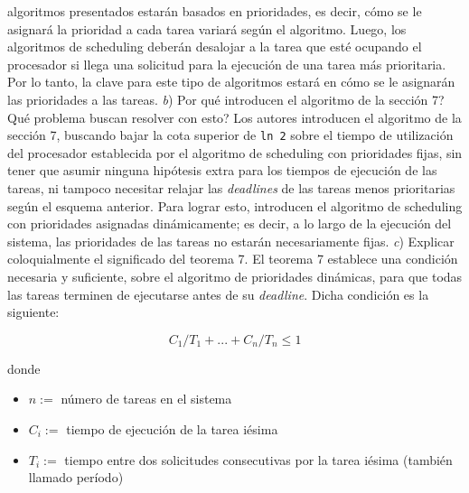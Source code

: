 algoritmos presentados estar\'an basados en prioridades, es decir, c\'omo se le asignar\'a la prioridad a cada tarea variar\'a seg\'un el algoritmo. Luego, los algoritmos
de scheduling deber\'an desalojar a la tarea que est\'e ocupando el procesador si llega una solicitud para la ejecuci\'on de una
tarea m\'as prioritaria. Por lo tanto, la clave para este tipo de algoritmos estar\'a en c\'omo se le asignar\'an las prioridades a las tareas.
\newline
\newline
\textit{b}) \textquestiondown Por qu\'e introducen el algoritmo de la secci\'on 7? \textquestiondown Qu\'e problema buscan resolver con esto?
\newline
\newline
Los autores introducen el algoritmo de la secci\'on 7, buscando bajar la cota superior de \verb|ln 2| sobre el tiempo de utilizaci\'on del procesador establecida 
por el algoritmo de scheduling con prioridades fijas, sin tener que asumir ninguna hip\'otesis extra para los tiempos de ejecuci\'on de las tareas, ni tampoco 
necesitar relajar las \textit{deadlines} de las tareas menos prioritarias seg\'un el esquema anterior. Para lograr esto, introducen el algoritmo de 
scheduling con prioridades asignadas din\'amicamente; es decir, a lo largo de la ejecuci\'on del sistema, las prioridades de las tareas no estar\'an
necesariamente fijas.
\newline
\newline
\textit{c}) Explicar coloquialmente el significado del teorema 7.
\newline
\newline
El teorema 7 establece una condici\'on necesaria y suficiente, sobre el algoritmo de prioridades din\'amicas, para que todas las tareas terminen de ejecutarse
antes de su \textit{deadline}. Dicha condici\'on es la siguiente:

\begin{equation*}
 C_{1}/T_{1} + ... + C_{n}/T_{n} \leq 1
\end{equation*}

donde
\begin{itemize}
  \item $n:=$ n\'umero de tareas en el sistema
  \item $C_{i}:=$ tiempo de ejecuci\'on de la tarea i\'esima
  \item $T_{i}:=$ tiempo entre dos solicitudes consecutivas por la tarea i\'esima (tambi\'en llamado per\'iodo)
\end{itemize}

